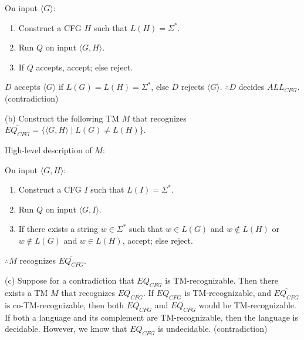 \documentclass{article}
\theoremstyle{definition}
\newenvironment {solution}
{
\begin{tcolorbox}
}
{
\end{tcolorbox}
}
\begin{document}
\begin{enumerate}
\begin{solution}
        On input $\langle G \rangle$:
        \begin{enumerate}
            \item Construct a CFG $H$ such that $L(H) = \Sigma^*$.
            \item Run $Q$ on input $\langle G, H \rangle$.
            \item If $Q$ accepts, accept; else reject.
        \end{enumerate}
        $D$ accepts $\langle G \rangle$ if $L(G) = L(H) = \Sigma^*$, else $D$
        rejects $\langle G \rangle$. $\therefore D$ decides $ALL_{CFG}$.
        (contradiction)
    \end{solution}

    \begin{solution}
        (b) Construct the following TM $M$ that recognizes 
        $\overline{EQ_{CFG}} = \{\langle G, H\rangle \mid L(G) \neq L(H)\}$.
        
        High-level description of $M$:
        
        On input $\langle G, H \rangle$:
        \begin{enumerate}
            \item Construct a CFG $I$ such that $L(I) = \Sigma^*$.
            \item Run $Q$ on input $\langle G, I \rangle$.
            \item If there exists a string $w \in \Sigma^*$ such that $w \in L(G)$
            and $w \notin L(H)$ or $w \notin L(G)$ and $w \in L(H)$, accept; else reject.
        \end{enumerate}
        $\therefore M$ recognizes $\overline{EQ_{CFG}}$.
    \end{solution}

    \begin{solution}
        (c) Suppose for a contradiction that $EQ_{CFG}$ is TM-recognizable.
        Then there exists a TM $M$ that recognizes $EQ_{CFG}$. If $EQ_{CFG}$ is
        TM-recognizable, and $\overline{EQ_{CFG}}$ is co-TM-recognizable, then
        both $EQ_{CFG}$ and $\overline{EQ_{CFG}}$ would be TM-recognizable.
        If both a language and its complement are TM-recognizable, then the
        language is decidable. However, we know that $EQ_{CFG}$ is undecidable.
        (contradiction)
    \end{solution}

\end{enumerate}
\end{document}
